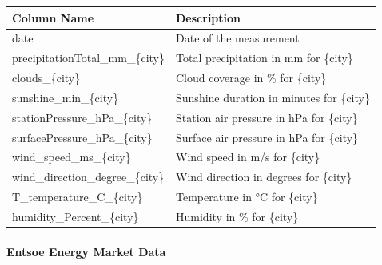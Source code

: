 \documentclass[a4paper]{article}
\begin{document}
{\fontsize{8pt}{10pt}\selectfont\begin{longtable}[]{@{}
  >{\raggedright\arraybackslash}p{}
  >{\raggedright\arraybackslash}p{}@{}}
\toprule\noalign{}
\begin{minipage}[b]{\linewidth}\raggedright
Column Name
\end{minipage} & \begin{minipage}[b]{\linewidth}\raggedright
Description
\end{minipage} \\
\midrule\noalign{}
\endhead
\bottomrule\noalign{}
\endlastfoot
date & Date of the measurement \\
precipitationTotal\_mm\_\{city\} & Total precipitation in mm for
\{city\} \\
clouds\_\{city\} & Cloud coverage in \% for \{city\} \\
sunshine\_min\_\{city\} & Sunshine duration in minutes for \{city\} \\
stationPressure\_hPa\_\{city\} & Station air pressure in hPa for
\{city\} \\
surfacePressure\_hPa\_\{city\} & Surface air pressure in hPa for
\{city\} \\
wind\_speed\_ms\_\{city\} & Wind speed in m/s for \{city\} \\
wind\_direction\_degree\_\{city\} & Wind direction in degrees for
\{city\} \\
T\_temperature\_C\_\{city\} & Temperature in °C for \{city\} \\
humidity\_Percent\_\{city\} & Humidity in \% for \{city\} \\
\end{longtable}}

    \paragraph{Entsoe Energy Market Data}\label{entsoe-energy-market-data}
\end{document}

